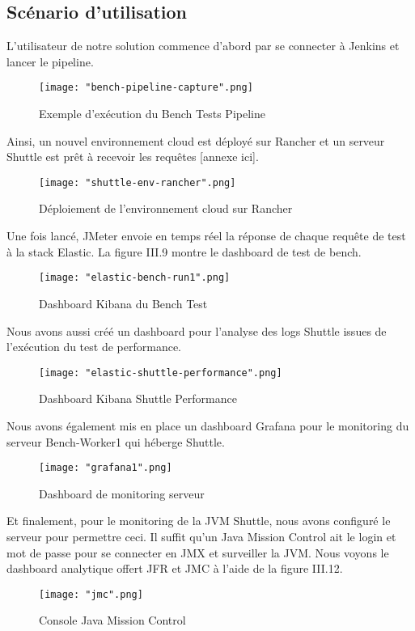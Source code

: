 \begin{spacing}{1.2}
\subsection{Scénario d’utilisation}
L'utilisateur de notre solution commence d'abord par se connecter à Jenkins et lancer le pipeline.
\begin{figure}[!ht]\centering
\texttt{[image: "bench-pipeline-capture".png]} 
\caption{Exemple d'exécution du Bench Tests Pipeline}
\label{fig:fig7}
\end{figure}
\FloatBarrier
Ainsi, un nouvel environnement cloud est déployé sur Rancher et un serveur Shuttle est prêt à recevoir les requêtes [annexe ici].
\begin{figure}[!ht]\centering
\texttt{[image: "shuttle-env-rancher".png]}
\caption{Déploiement de l'environnement cloud sur Rancher}
\label{fig:fig8}
\end{figure}
\FloatBarrier
Une fois lancé, JMeter envoie en temps réel la réponse de chaque requête de test à la stack Elastic. La figure III.9 montre le dashboard de test de bench.
\begin{figure}[!ht]\centering
\texttt{[image: "elastic-bench-run1".png]}
\caption{Dashboard Kibana du Bench Test}
\label{fig:fig9}
\end{figure}
\FloatBarrier
Nous avons aussi créé un dashboard pour l'analyse des logs Shuttle issues de l'exécution du test de performance. 
\begin{figure}[!ht]\centering
\texttt{[image: "elastic-shuttle-performance".png]} 
\caption{Dashboard Kibana Shuttle Performance}
\label{fig:fig10}
\end{figure}
\FloatBarrier
Nous avons également mis en place un dashboard Grafana pour le monitoring du serveur Bench-Worker1 qui héberge Shuttle. 
\begin{figure}[!ht]\centering
\texttt{[image: "grafana1".png]} 
\caption{Dashboard de monitoring serveur}
\label{fig:fig11}
\end{figure}
\FloatBarrier
Et finalement, pour le monitoring de la JVM Shuttle, nous avons configuré le serveur pour permettre ceci. Il suffit qu'un Java Mission Control ait le login et mot de passe pour se connecter en JMX et surveiller la JVM.
Nous voyons le dashboard analytique offert JFR et JMC à l'aide de la figure III.12. 
\begin{figure}[!ht]\centering
\texttt{[image: "jmc".png]} 
\caption{Console Java Mission Control}
\label{fig:fig12}
\end{figure}
\FloatBarrier

\end{spacing}
